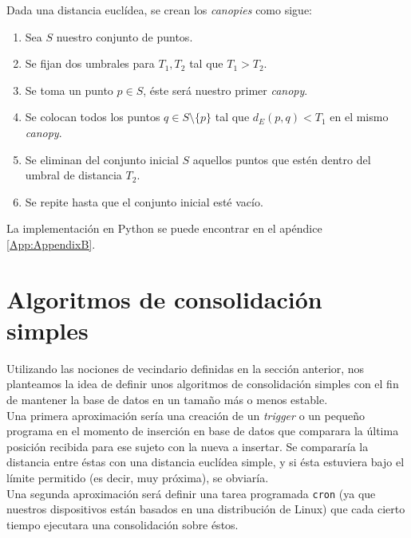 \documentclass[a4paper, 12pt, spanish]{article}
\begin{document}
Dada una distancia eucl\'idea, se crean los \textit{canopies} como sigue:\\

\begin{enumerate}
	\item Sea $S$ nuestro conjunto de puntos.
	\item Se fijan dos umbrales para $T_1, T_2$ tal que $T_1 > T_2$. 
	\item Se toma un punto $p\in S$, \'este ser\'a nuestro primer \textit{canopy}.
	\item Se colocan todos los puntos $q\in S\setminus\{p\}$ tal que $d_E(p, q) < T_1$ en el mismo \textit{canopy}. 
	\item Se eliminan del conjunto inicial $S$ aquellos puntos que est\'en dentro del umbral de distancia $T_2$.
	\item Se repite hasta que el conjunto inicial est\'e vac\'io.
\end{enumerate}

La implementaci\'on\cite{canopyGitHub} en Python se puede encontrar en el ap\'endice \ref{App:AppendixB}.\\

\pagebreak
\section{Algoritmos de consolidaci\'on simples}\label{sec:simple}

Utilizando las nociones de vecindario definidas en la secci\'on anterior, nos planteamos la idea de definir unos algoritmos de consolidaci\'on simples con el fin de mantener la base de datos en un tama\~no m\'as o menos estable. \\

Una primera aproximaci\'on ser\'ia una creaci\'on de un \textit{trigger} o un peque\~no programa en el momento de inserci\'on en base de datos que comparara la \'ultima posici\'on recibida para ese sujeto con la nueva a insertar. Se comparar\'ia la distancia entre \'estas con una distancia eucl\'idea simple, y si \'esta estuviera bajo el l\'imite permitido (es decir, muy pr\'oxima), se obviar\'ia. \\

Una segunda aproximaci\'on ser\'a definir una tarea programada \texttt{cron} (ya que nuestros dispositivos est\'an basados en una distribuci\'on de Linux) que cada cierto tiempo ejecutara una consolidaci\'on sobre \'estos. \\
\end{document}
